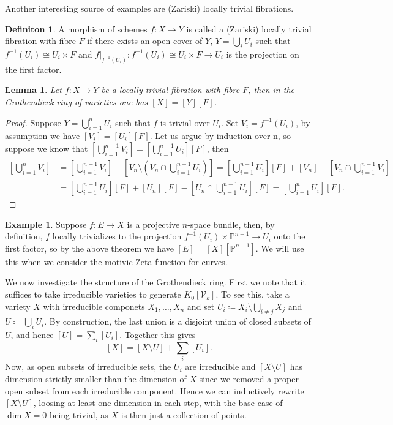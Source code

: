 \documentclass[11pt, a4paper, german]{article}
\theoremstyle{plain}
\newtheorem{lemma}[theorem]{Lemma}
\theoremstyle{definition}
\newtheorem{definition}[theorem]{Definiton}
\newtheorem{example}[theorem]{Example}
\newcommand{\gring}[1][k]{K_0[\mathcal{V}_#1]}
\begin{document}
Another interesting source of examples are (Zariski) locally trivial fibrations.
\begin{definition}
    A morphism of schemes $f \colon X \to Y$ is called a (Zariski) locally trivial fibration with fibre $F$ if there exists an open cover of $Y$,
    $Y = \bigcup_{i} U_i$ such that $f^{-1}(U_i) \cong U_i \times F$ and $f|_{f^{-1}(U_i)} \colon f^{-1}(U_i) \cong U_i \times F \to U_i$ is
    the projection on the first factor.
\end{definition}

\begin{lemma}
    \label{fibration}
    Let $f \colon X \to Y$ be a locally trivial fibration with fibre $F$, then in the Grothendieck ring of varieties
    one has $[X] = [Y][F]$.
\end{lemma}
\begin{proof}
    Suppose $Y = \bigcup_{i=1}^n U_i$ such that $f$ is trivial over $U_i$. Set $V_i = f^{-1}(U_i)$, by assumption we have $[V_i] = [U_i][F]$. 
    Let us argue by induction over n, so suppose we know that 
    $\left[ \bigcup_{i=1}^{n-1} V_i \right] = \left[\bigcup_{i=1}^{n-1} U_i \right][F]$, then
    \begin{align*}
        \left [ \bigcup_{i=1}^n V_i \right ]       
        &= \left [ \bigcup_{i=1}^{n-1} V_i \right ] + \left [ V_n \setminus (V_n \cap \bigcup_{i=1}^{n-1} U_i) \right ]
         = \left [ \bigcup_{i=1}^{n-1} U_i \right ][F] + [V_n] - \left [ V_n \cap \bigcup_{i=1}^{n-1} V_i \right ] \\
        &= \left [ \bigcup_{i=1}^{n-1} U_i \right ][F] + [U_n][F] - \left [ U_n \cap \bigcup_{i=1}^{n-1} U_i\right ][F]
         = \left [ \bigcup_{i=1}^n U_i \right ][F].
    \end{align*}
\end{proof}

\begin{example}
    \label{projBundle}
    Suppose $f \colon E \to X$ is a projective $n$-space bundle, then, by definition, $f$ locally trivializes to the projection
    $f^{-1}(U_i) \times \mathbb{P}^{n-1} \to U_i$ onto the first factor, so by the above theorem we have
    $[E] = [X][\mathbb{P}^{n-1}]$. We will use this when we consider the motivic Zeta function for curves.
\end{example}

We now investigate the structure of the Grothendieck ring. First we note that it suffices to take irreducible varieties to generate $\gring[k]$.
To see this, take a variety $X$ with irreducible componets $X_1, \dots, X_n$ and set ${U_i \coloneqq X_i \setminus \bigcup_{i \neq j} X_j}$ and
$U \coloneqq \bigcup_i U_i$. By construction, the last union is a disjoint union of closed subsets of $U$, 
and hence $[U] = \sum_i [U_i]$. Together this gives
\[
    [X] = [X \setminus U] + \sum_i [U_i].
\] Now, as open subsets of irreducible sets, the $U_i$ are irreducible and $[X \setminus U]$ has dimension
strictly smaller than the dimension of $X$ since we removed a proper open subset from each irreducible component. Hence we can inductively
rewrite $[X \setminus U]$, loosing at least one dimension in each step, with the base case of $\dim  X = 0$ being trivial, as $X$ is then
just a collection of points.
\end{document}

